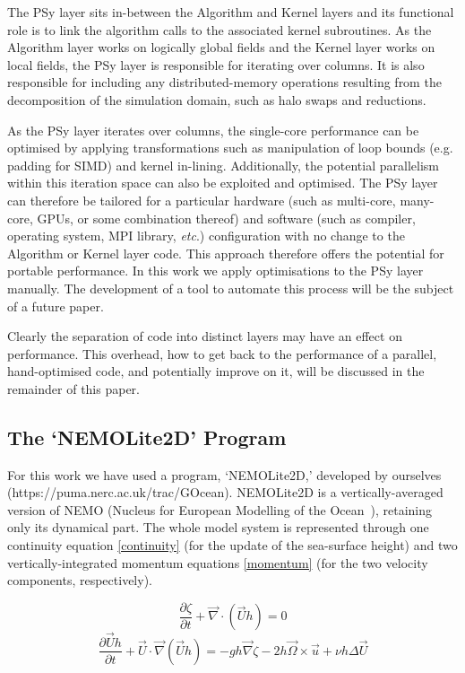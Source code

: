 \documentclass[gmdd, manuscript]{copernicus}
\begin{document}
The PSy layer sits in-between the Algorithm and Kernel layers and its
functional role is to link the algorithm calls to the associated
kernel subroutines. As the Algorithm layer works on logically global
fields and the Kernel layer works on local fields, the PSy layer is
responsible for iterating over columns. It is also responsible for
including any distributed-memory operations resulting from the
decomposition of the simulation domain, such as halo swaps and
reductions.

As the PSy layer iterates over columns, the single-core performance
can be optimised by applying transformations such as manipulation of
loop bounds (e.g. padding for SIMD) and kernel
in-lining. Additionally, the potential parallelism within this
iteration space can also be exploited and optimised. The PSy layer can
therefore be tailored for a particular hardware (such as multi-core,
many-core, GPUs, or some combination thereof) and software (such as
compiler, operating system, MPI library, \textit{etc}.) configuration
with no change to the Algorithm or Kernel layer code. This approach
therefore offers the potential for portable performance. In this work
we apply optimisations to the PSy layer manually. The development of a
tool to automate this process will be the subject of a future paper.

Clearly the separation of code into distinct layers may have an effect
on performance. This overhead, how to get back to the performance of a
parallel, hand-optimised code, and potentially improve on it, will be
discussed in the remainder of this paper.

\subsection{The `NEMOLite2D' Program}

For this work we have used a program, `NEMOLite2D,' developed by
ourselves (https://puma.nerc.ac.uk/trac/GOcean).  NEMOLite2D is a
vertically-averaged version of NEMO (Nucleus for European Modelling of
the Ocean~\citep{nemo}), retaining only its dynamical part. The whole
model system is represented through one continuity equation
\eqref{continuity} (for the update of the sea-surface height) and two
vertically-integrated momentum equations \eqref{momentum} (for the two
velocity components, respectively).

\begin{equation}\label{continuity}
 \frac{\partial \zeta}{\partial t} + \vec{\nabla} \cdot (\vec{U}h) = 0
\end{equation}
\begin{equation}\label{momentum}
 \frac{\partial \vec{U}h}{\partial t}
   + \vec{U} \cdot \vec{\nabla} (\vec{U}h) = 
   - gh \vec{\nabla} \zeta - 2h \vec{\Omega} \times \vec{u}
   + \nu h \Delta \vec{U}
\end{equation}
\end{document}
